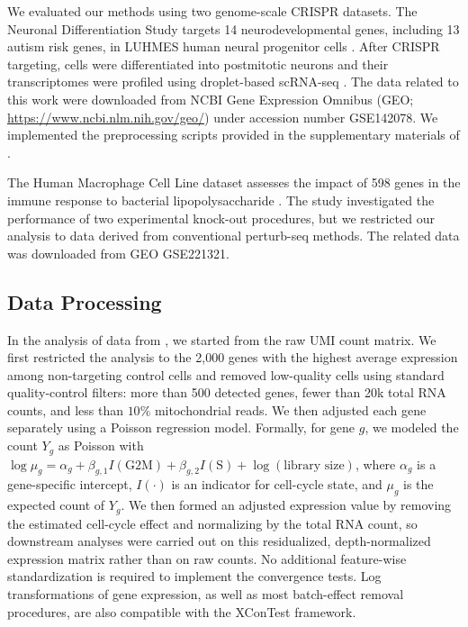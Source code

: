 \documentclass[11pt]{article}
\begin{document}
We evaluated our methods using two genome-scale CRISPR datasets. The Neuronal Differentiation Study targets 14 neurodevelopmental genes, including 13 autism risk genes, in LUHMES human neural progenitor cells \citep{lalli2020high}. After CRISPR targeting, cells were differentiated into postmitotic neurons and their transcriptomes were profiled using droplet-based scRNA-seq \citep{zheng2017massively}. The data related to this work were downloaded from NCBI Gene Expression Omnibus (GEO; \url{https://www.ncbi.nlm.nih.gov/geo/}) under accession number GSE142078. We implemented the preprocessing scripts provided in the supplementary materials of \cite{lalli2020high}.

The Human Macrophage Cell Line dataset assesses the impact of 598 genes in the immune response to bacterial lipopolysaccharide \citep{yao2024scalable}. The study investigated the performance of two experimental knock-out procedures, but we restricted our analysis to data derived from conventional perturb-seq methods. The related data was downloaded from GEO GSE221321. 

\subsection*{Data Processing}

In the analysis of data from \cite{yao2024scalable}, we started from the raw UMI count matrix. We first restricted the analysis to the 2,000 genes with the highest average expression among non-targeting control cells and removed low-quality cells using standard quality-control filters: more than 500 detected genes, fewer than 20k total RNA counts, and less than $10 \%$ mitochondrial reads. We then adjusted each gene separately using a Poisson regression model. Formally, for gene $g$, we modeled the count $Y_{g}$ as Poisson with $\log \mu_{g}=\alpha_g+\beta_{g, 1} I\left({\mathrm{G} 2 \mathrm{M}}\right)+\beta_{g, 2} I\left(\mathrm{S}\right)+\log (\text{library size})$, where $\alpha_g$ is a gene-specific intercept, $I(\cdot)$ is an indicator for cell-cycle state, and $\mu_{g}$ is the expected count of $Y_{g}$. We then formed an adjusted expression value by removing the estimated cell-cycle effect and normalizing by the total RNA count, so downstream analyses were carried out on this residualized, depth-normalized expression matrix rather than on raw counts. No additional feature-wise standardization is required to implement the convergence tests. Log transformations of gene expression, as well as most batch-effect removal procedures, are also compatible with the XConTest framework.
\end{document}

